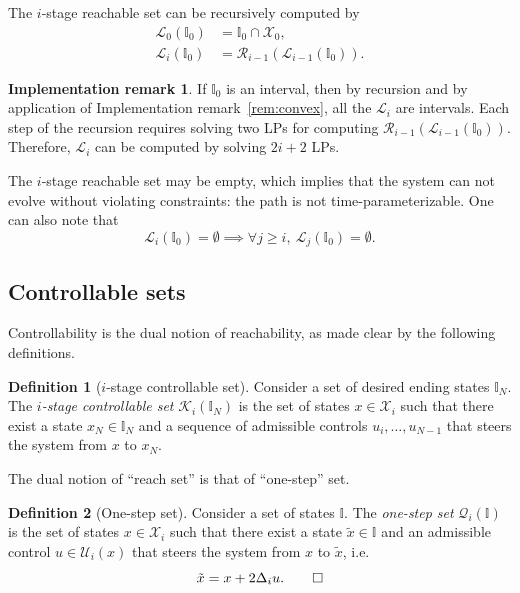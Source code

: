 \documentclass[journal]{IEEEtran}
\theoremstyle{plain}
\theoremstyle{definition}
\newtheorem{definition2}{Definition}
\newenvironment{definition}
  {\renewcommand{\qedsymbol}{$\lozenge$}
   \pushQED{\qed}\begin{definition2}}
  {\popQED\end{definition2}}
\theoremstyle{definition}
\newtheorem{remark2}{Implementation remark}
\newenvironment{remark}
  {\renewcommand{\qedsymbol}{$\lozenge$}%
   \pushQED{\qed}\begin{remark2}}
  {\popQED\end{remark2}}
\newcommand{\calX}{\mathcal{X}}
\newcommand{\calU}{\mathcal{U}}
\newcommand{\bbI}{\mathbb{I}}
\newcommand{\calR}{\mathcal{R}}
\newcommand{\calQ}{\mathcal{Q}}
\newcommand{\calL}{\mathcal{L}}
\begin{document}
The $i$-stage reachable set can be recursively computed by
\begin{equation}
  \label{eq:rch-com}
  \begin{aligned}
    \calL_0(\bbI_0) &= \bbI_0 \cap \calX_0,\\
    \calL_i(\bbI_0) &= \calR_{i-1}(\calL_{i-1}(\bbI_0)).
  \end{aligned}
\end{equation}

\begin{remark}
  \label{rem:reachable}
  If $\bbI_0$ is an interval, then by recursion and by application of
  Implementation remark~\ref{rem:convex}, all the $\calL_i$ are
  intervals. Each step of the recursion requires solving two LPs for
  computing $\calR_{i-1}(\calL_{i-1}(\bbI_0))$. Therefore, $\calL_i$
  can be computed by solving $2i + 2$ LPs.
\end{remark}

The $i$-stage reachable set may be empty, which implies that the
system can not evolve without violating constraints: the path is not
time-parameterizable. One can also note that
\begin{equation*}
  \calL_i(\bbI_0) = \emptyset \implies   \forall j \geq i,\ \calL_j (\bbI_0) =
  \emptyset.
\end{equation*}

\subsection{Controllable sets}
\label{sec:controllable-sets}

Controllability is the dual notion of reachability, as made clear by
the following definitions.

\begin{definition}[$i$-stage controllable set]
  Consider a set of desired ending states $\bbI_N$. The
  \emph{$i$-stage controllable set} $\mathcal{K}_i(\bbI_N)$ is the set
  of states $x\in\calX_i$ such that there exist a state
  $x_N\in \bbI_N$ and a sequence of admissible controls
  $u_i,\dots, u_{N-1}$ that steers the system from $x$ to $x_N$.
\end{definition}

The dual notion of ``reach set'' is that of ``one-step'' set.
\begin{definition}[One-step set]
  Consider a set of states $\bbI$. The \emph{one-step set}
  $\calQ_i(\bbI)$ is the set of states $x\in\calX_{i}$ such that there exist a
  state $\tilde{x}\in\bbI$ and an admissible control $u\in\calU_i(x)$ that
  steers the system from $x$ to $\tilde{x}$, i.e.
  \[
  \tilde{x} = x + 2\Delta_i u. \qedhere
  \]
\end{definition}
\end{document}
